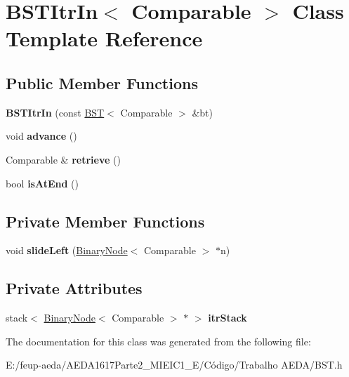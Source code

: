 \hypertarget{class_b_s_t_itr_in}{}\section{B\+S\+T\+Itr\+In$<$ Comparable $>$ Class Template Reference}
\label{class_b_s_t_itr_in}
\subsection*{Public Member Functions}
\begin{DoxyCompactItemize}
\item 
\mbox{\label{class_b_s_t_itr_in_ac836e2f560fed9cc7ef8e5431a2836cc}} 
{\bfseries B\+S\+T\+Itr\+In} (const \hyperlink{class_b_s_t}{B\+ST}$<$ Comparable $>$ \&bt)
\item 
\mbox{\label{class_b_s_t_itr_in_ac772d3ebbac748c5f8cf9bc659f2e32c}} 
void {\bfseries advance} ()
\item 
\mbox{\label{class_b_s_t_itr_in_ac7ac215c1247bd25fc1fdb8053826a32}} 
Comparable \& {\bfseries retrieve} ()
\item 
\mbox{\label{class_b_s_t_itr_in_a6f9a43217862c263a9bf15b9a08b889a}} 
bool {\bfseries is\+At\+End} ()
\end{DoxyCompactItemize}
\subsection*{Private Member Functions}
\begin{DoxyCompactItemize}
\item 
\mbox{\label{class_b_s_t_itr_in_a896191c02da37364153df2363ff28e7e}} 
void {\bfseries slide\+Left} (\hyperlink{class_binary_node}{Binary\+Node}$<$ Comparable $>$ $\ast$n)
\end{DoxyCompactItemize}
\subsection*{Private Attributes}
\begin{DoxyCompactItemize}
\item 
\mbox{\label{class_b_s_t_itr_in_ad7cb5e89f04cf08f5615aa53614dd916}} 
stack$<$ \hyperlink{class_binary_node}{Binary\+Node}$<$ Comparable $>$ $\ast$ $>$ {\bfseries itr\+Stack}
\end{DoxyCompactItemize}


The documentation for this class was generated from the following file\+:\begin{DoxyCompactItemize}
\item 
E\+:/feup-\/aeda/\+A\+E\+D\+A1617\+Parte2\+\_\+M\+I\+E\+I\+C1\+\_\+\+E/\+Código/\+Trabalho A\+E\+D\+A/B\+S\+T.\+h\end{DoxyCompactItemize}
